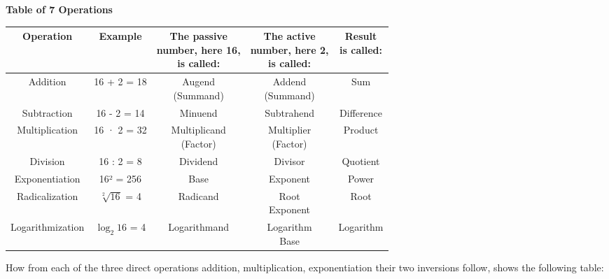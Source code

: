 \thispagestyle{fancy}

\vspace{0.5cm}

{\centering
\textbf{Table of 7 Operations}

\vspace{0.3cm}

{\fontsize{10}{12}\selectfont
\renewcommand{\arraystretch}{1.5}
\begin{tabular}{|c|c|c|c|c|}
    \hline
    Operation & Example & \makecell{The passive \\ number, here 16, \\ is called:} & \makecell{The active \\ number, here 2, \\ is called:} & \makecell{Result \\ is called:} \\
    \hline
    Addition & 16 + 2 = 18 & \makecell{Augend \\ (Summand)} & \makecell{Addend \\ (Summand)} & Sum \\
    \hline
    Subtraction & 16 - 2 = 14 & Minuend & Subtrahend & Difference \\
    \hline
    Multiplication & 16 · 2 = 32 & \makecell{Multiplicand \\ (Factor)} & \makecell{Multiplier \\ (Factor)} & Product \\
    \hline
    Division & 16 : 2 = 8 & Dividend & Divisor & Quotient \\
    \hline
    Exponentiation & 16² = 256 & Base & Exponent & Power \\
    \hline
    Radicalization & $\sqrt[2]{16}$ = 4 & Radicand & \makecell{Root \\ Exponent} & Root \\
    \hline
    Logarithmization & $\log_2 16$ = 4 & Logarithmand & \makecell{Logarithm \\ Base} & Logarithm \\
    \hline
\end{tabular}
}
}

\vspace{0.3cm}
How from each of the three direct operations addition, multiplication, exponentiation their two inversions follow, shows the following table:
\vspace{0.3cm}

